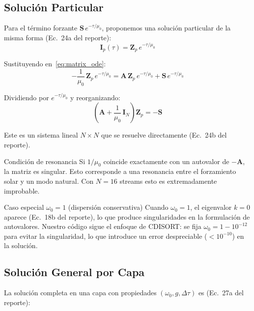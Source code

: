 \documentclass[a4paper,11pt]{article}
\begin{document}
\subsection{Soluci\'on Particular}

Para el t\'ermino forzante $\mathbf{S}\,e^{-\tau/\mu_0}$, proponemos una
soluci\'on particular de la misma forma (Ec.~24a del reporte):
\begin{equation}
    \mathbf{I}_p(\tau) = \mathbf{Z}_p\,e^{-\tau/\mu_0}
\end{equation}

Sustituyendo en~\eqref{eq:matrix_ode}:
\begin{equation}
    -\frac{1}{\mu_0}\,\mathbf{Z}_p\,e^{-\tau/\mu_0}
    = \mathbf{A}\,\mathbf{Z}_p\,e^{-\tau/\mu_0}
    + \mathbf{S}\,e^{-\tau/\mu_0}
\end{equation}

Dividiendo por $e^{-\tau/\mu_0}$ y reorganizando:
\begin{equation}\label{eq:particular}
    \boxed{\left(\mathbf{A} + \frac{1}{\mu_0}\,\mathbf{I}_N\right)\mathbf{Z}_p
    = -\mathbf{S}}
\end{equation}

Este es un sistema lineal $N\times N$ que se resuelve directamente (Ec.~24b
del reporte).

\begin{physics}{Condici\'on de resonancia}
Si $1/\mu_0$ coincide exactamente con un autovalor de $-\mathbf{A}$, la matriz
es singular.  Esto corresponde a una resonancia entre el forzamiento solar y
un modo natural.  Con $N = 16$ streams esto es extremadamente improbable.
\end{physics}

\begin{concept}{Caso especial $\omega_0 = 1$ (dispersi\'on conservativa)}
Cuando $\omega_0 = 1$, el eigenvalor $k = 0$ aparece (Ec.~18b del reporte),
lo que produce singularidades en la formulaci\'on de autovalores.  Nuestro
c\'odigo sigue el enfoque de CDISORT: se fija
$\omega_0 = 1 - 10^{-12}$ para evitar la singularidad, lo que introduce un
error despreciable ($< 10^{-10}$) en la soluci\'on.
\end{concept}


\subsection{Soluci\'on General por Capa}

La soluci\'on completa en una capa con propiedades $(\omega_0, g, \Delta\tau)$ es
(Ec.~27a del reporte):
\end{document}
